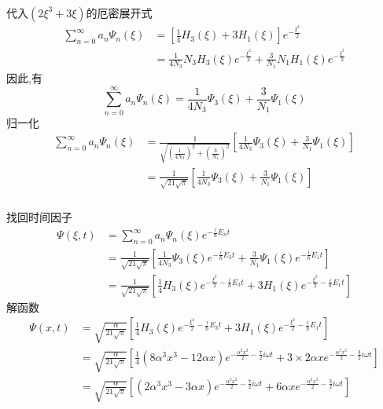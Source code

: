 \begin{frame}
    \frametitle{}
    代入$(2\xi^3 +3 \xi)$的厄密展开式
		 \[  \begin{aligned}
			\sum_{n=0} ^{\infty} a_n \Psi_n(\xi) &= \left[\frac{1}{4} H_3(\xi)+ 3 H_1(\xi)\right] e^{-\frac{ \xi^2}{2}} \\
			&= \frac{1}{4 N_3} N_3 H_3(\xi) e^{-\frac{ \xi^2}{2}} + \frac{3}{N_1} N_1 H_1(\xi) e^{-\frac{ \xi^2}{2}} 
		 \end{aligned}\]
		因此,有\[ \sum_{n=0} ^{\infty} a_n \Psi_n(\xi) = \frac{1}{4 N_3}\Psi_3(\xi) + \frac{3}{N_1} \Psi_1(\xi)\]
		归一化
		\[ \begin{aligned}
			\sum_{n=0} ^{\infty} a_n \Psi_n(\xi) &= \frac{1}{\sqrt{(\frac{1}{4 N_3})^2 + (\frac{3}{N_1})^2} } \left[ \frac{1}{4 N_3}\Psi_3(\xi) + \frac{3}{N_1} \Psi_1(\xi)\right] \\ 
			&= \frac{1}{\sqrt{21 \sqrt{\pi} }} \left[\frac{1}{4 N_3}\Psi_3(\xi) + \frac{3}{N_1} \Psi_1(\xi)\right]
		\end{aligned}\]
  \end{frame} 
  
  \begin{frame}
    \frametitle{}
	找回时间因子
	\[\begin{aligned}
	 \Psi (\xi,t) &= \sum_{n=0} ^{\infty} a_n \Psi_n(\xi) e^{-\frac{i}{\hbar} E_n t} \\ &= \frac{1}{\sqrt{21 \sqrt{\pi} }} \left[\frac{1}{4 N_3}\Psi_3(\xi) e^{-\frac{i}{\hbar} E_3 t}+ \frac{3}{N_1} \Psi_1(\xi)e^{-\frac{i}{\hbar} E_1 t} \right]\\ 
	 &= \frac{1}{\sqrt{21 \sqrt{\pi} }} \left[\frac{1}{4} H_3(\xi) e^{ -\frac{ \xi^2}{2} -\frac{i}{\hbar} E_3 t}+ 3 H_1(\xi)e^{ -\frac{ \xi^2}{2} -\frac{i}{\hbar} E_1 t} \right] 
	\end{aligned} \]
	解函数
	\[\begin{aligned}
	 \Psi (x,t) &= \sqrt{\frac{\alpha}{21 \sqrt{\pi} }} \left[\frac{1}{4} H_3(\xi) e^{ -\frac{ \xi^2}{2} -\frac{i}{\hbar} E_3 t}+ 3 H_1(\xi)e^{ -\frac{ \xi^2}{2} -\frac{i}{\hbar} E_1 t} \right] \\
	 &= \sqrt{\frac{\alpha}{21 \sqrt{\pi} }} \left[\frac{1}{4} (8\alpha ^3 x^3 -12 \alpha x) e^{ -\frac{ \alpha ^2 x^2}{2} -\frac{7}{2} i \omega t}+ 3 \times 2 \alpha x e^{ -\frac{ \alpha ^2 x^2 }{2} -\frac{3}{2} i \omega t} \right]\\
	 &= \sqrt{\frac{\alpha}{21 \sqrt{\pi} }} \left[(2\alpha ^3 x^3 -3 \alpha x) e^{ -\frac{ \alpha ^2 x^2}{2} -\frac{7}{2} i \omega t}+ 6 \alpha x e^{ -\frac{ \alpha ^2 x^2 }{2} -\frac{3}{2} i \omega t}\right]
	\end{aligned} \]
  \end{frame} 

